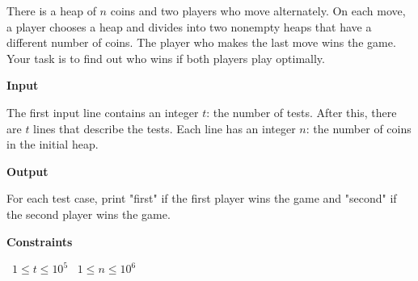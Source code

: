 There is a heap of $n$ coins and two players who move alternately. On each move, a player chooses a heap and divides into two nonempty heaps that have a different number of coins. The player who makes the last move wins the game.
Your task is to find out who wins if both players play optimally.

\vspace{0.3cm}\noindent\textbf{Input}

The first input line contains an integer $t$: the number of tests.
After this, there are $t$ lines that describe the tests. Each line has an integer $n$: the number of coins in the initial heap.

\vspace{0.3cm}\noindent\textbf{Output}

For each test case, print "first" if the first player wins the game and "second" if the second player wins the game.

\vspace{0.3cm}\noindent\textbf{Constraints}

\textbullet\ $1 \le t \le 10^5$
\textbullet\ $1 \le n \le 10^6$